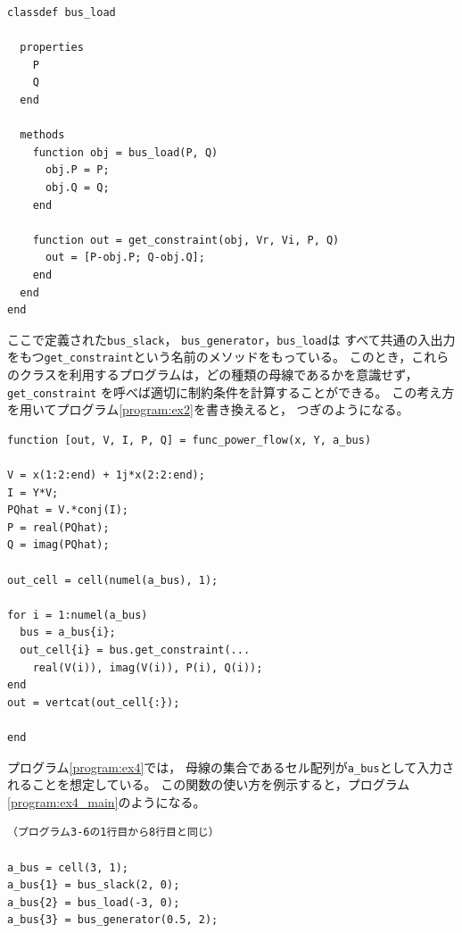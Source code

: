 \documentclass[tombow,dvipdfmx]{corona-a5-1.1}
\begin{document}
\begin{例}[多態性を用いた潮流計算の実装例]
\smallskip
\begin{PROGRAMA}[count,title={bus\_load.m}]\label{program:bus_PQ}
\begin{verbatim}
classdef bus_load
  
  properties
    P
    Q
  end
  
  methods
    function obj = bus_load(P, Q)
      obj.P = P;
      obj.Q = Q;
    end
    
    function out = get_constraint(obj, Vr, Vi, P, Q)
      out = [P-obj.P; Q-obj.Q];
    end
  end
end
\end{verbatim}
\end{PROGRAMA}

\smallskip

ここで定義された\verb|bus_slack|，
\verb|bus_generator|，\verb|bus_load|は
すべて共通の入出力をもつ\verb|get_constraint|という名前のメソッドをもっている。
このとき，これらのクラスを利用するプログラムは，どの種類の母線であるかを意識せず，\verb|get_constraint|
を呼べば適切に制約条件を計算することができる。
この考え方を用いてプログラム\nobreak\ref{program:ex2}を書き換えると，
つぎのようになる。


\smallskip
\begin{PROGRAMA}[count, title={func\_power\_flow.m}]\label{program:ex4}%
\begin{verbatim}
function [out, V, I, P, Q] = func_power_flow(x, Y, a_bus)

V = x(1:2:end) + 1j*x(2:2:end);
I = Y*V;
PQhat = V.*conj(I);
P = real(PQhat);
Q = imag(PQhat);

out_cell = cell(numel(a_bus), 1);

for i = 1:numel(a_bus)
  bus = a_bus{i};
  out_cell{i} = bus.get_constraint(...
    real(V(i)), imag(V(i)), P(i), Q(i));
end
out = vertcat(out_cell{:});

end
\end{verbatim}
\end{PROGRAMA}

プログラム\nobreak\ref{program:ex4}では，
母線の集合であるセル配列が\verb|a_bus|として入力されることを想定している。
この関数の使い方を例示すると，プログラム\nobreak\ref{program:ex4_main}のようになる。

\smallskip
\begin{PROGRAMA}[count,title={main\_ex4.m}]\label{program:ex4_main}
\begin{verbatim}
（プログラム3-6の1行目から8行目と同じ）

a_bus = cell(3, 1);
a_bus{1} = bus_slack(2, 0);
a_bus{2} = bus_load(-3, 0);
a_bus{3} = bus_generator(0.5, 2);


\end{verbatim}
\end{PROGRAMA}
\end{例}
\end{document}
